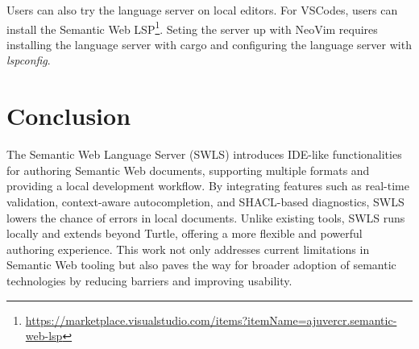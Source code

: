 Users can also try the language server on local editors.
For VSCodes, users can install the Semantic Web LSP\footnote{\url{https://marketplace.visualstudio.com/items?itemName=ajuvercr.semantic-web-lsp}}.
Seting the server up  with NeoVim requires installing the language server with cargo and configuring the language server with \textit{lspconfig}.

\section{Conclusion}

The Semantic Web Language Server (SWLS) introduces IDE-like functionalities for authoring Semantic Web documents, supporting multiple formats and providing a local development workflow. 
By integrating features such as real-time validation, context-aware autocompletion, and SHACL-based diagnostics, SWLS lowers the chance of errors in local documents.
Unlike existing tools, SWLS runs locally and extends beyond Turtle, offering a more flexible and powerful authoring experience.
This work not only addresses current limitations in Semantic Web tooling but also paves the way for broader adoption of semantic technologies by reducing barriers and improving usability.


